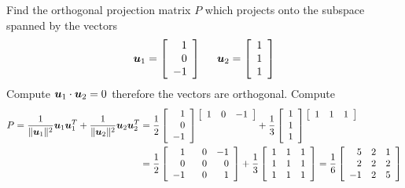 \begin{example}
Find the orthogonal projection matrix $P$ which projects onto the subspace spanned by the vectors
$$
\boldsymbol{u}_1 = \left[ \begin{array}{r} 1 \\ 0 \\ -1 \end{array} \right]
\hspace{5mm}
\boldsymbol{u}_2 = \left[ \begin{array}{r} 1 \\ 1 \\ 1 \end{array} \right]
$$
Compute $\boldsymbol{u}_1 \cdot \boldsymbol{u}_2 = 0$ therefore the vectors are orthogonal. Compute
\begin{align*}
P = \frac{1}{\| \bs{u}_1 \|^2} \bs{u}_1 \bs{u}_1^T +  \frac{1}{\| \bs{u}_2 \|^2} \bs{u}_2 \bs{u}_2^T
&= \frac{1}{2} \left[ \begin{array}{r} 1 \\ 0 \\ -1 \end{array} \right]
\raisebox{4mm}{$\left[ \begin{array}{rrr} 1 & 0 & -1 \end{array} \right]$}
+ \frac{1}{3} \left[ \begin{array}{r} 1 \\ 1 \\ 1 \end{array} \right]
\raisebox{4mm}{$\left[ \begin{array}{rrr} 1 & 1 & 1 \end{array} \right]$} \\
&= \frac{1}{2} \left[ \begin{array}{rrr} 1 & \phantom{+}0 & -1 \\ 0 & 0 & 0 \\ -1 & 0 & 1 \end{array} \right]
+ \frac{1}{3} \left[ \begin{array}{rrr} 1 & 1 & 1 \\ 1 & 1 & 1 \\ 1 & 1 & 1 \end{array} \right]
=
\frac{1}{6} \left[ \begin{array}{rrr} 5 & 2 & 1 \\ 2 & 2 & 2 \\ -1 & 2 & 5 \end{array} \right]
\end{align*}
\end{example}

